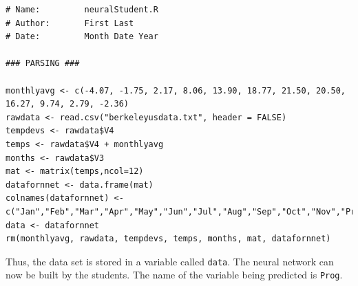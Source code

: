 \documentclass[11pt]{article}
\begin{document}
\begin{lstlisting}
# Name:         neuralStudent.R
# Author:       First Last
# Date:         Month Date Year

### PARSING ###

monthlyavg <- c(-4.07, -1.75, 2.17, 8.06, 13.90, 18.77, 21.50, 20.50, 16.27, 9.74, 2.79, -2.36)
rawdata <- read.csv("berkeleyusdata.txt", header = FALSE)
tempdevs <- rawdata$V4
temps <- rawdata$V4 + monthlyavg
months <- rawdata$V3
mat <- matrix(temps,ncol=12)
datafornnet <- data.frame(mat)
colnames(datafornnet) <- c("Jan","Feb","Mar","Apr","May","Jun","Jul","Aug","Sep","Oct","Nov","Prog")
data <- datafornnet
rm(monthlyavg, rawdata, tempdevs, temps, months, mat, datafornnet)
\end{lstlisting}

Thus, the data set is stored in a variable called \verb|data|. The neural network can now be built by the students. The name of the variable being predicted is \verb|Prog|. 
\end{document}
